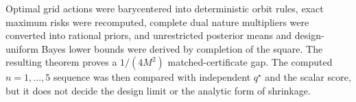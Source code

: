 Optimal grid actions were barycentered into deterministic orbit rules, exact maximum risks were recomputed, complete dual nature multipliers were converted into rational priors, and unrestricted posterior means and design-uniform Bayes lower bounds were derived by completion of the square.  The resulting theorem proves a \(1/(4M^2)\) matched-certificate gap.  The computed \(n=1,\ldots,5\) sequence was then compared with independent \(q^\star\) and the scalar score, but it does not decide the design limit or the analytic form of shrinkage.